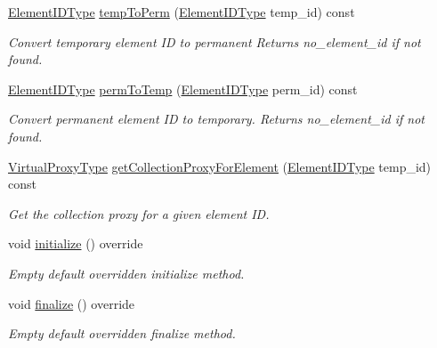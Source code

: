 \begin{DoxyCompactItemize}
\hyperlink{namespacevt_1_1vrt_1_1collection_1_1balance_a14c8d2c972f2913aa3f1636e5be0a120}{Element\+I\+D\+Type} \hyperlink{structvt_1_1vrt_1_1collection_1_1balance_1_1_node_stats_a259d49b9aa4759b9d94be3e093fa2e6b}{temp\+To\+Perm} (\hyperlink{namespacevt_1_1vrt_1_1collection_1_1balance_a14c8d2c972f2913aa3f1636e5be0a120}{Element\+I\+D\+Type} temp\+\_\+id) const
\begin{DoxyCompactList}\small\item\em Convert temporary element ID to permanent Returns {\ttfamily no\+\_\+element\+\_\+id} if not found. \end{DoxyCompactList}\item 
\hyperlink{namespacevt_1_1vrt_1_1collection_1_1balance_a14c8d2c972f2913aa3f1636e5be0a120}{Element\+I\+D\+Type} \hyperlink{structvt_1_1vrt_1_1collection_1_1balance_1_1_node_stats_a6e13d373b5365771b1f08fc0bd5c0bda}{perm\+To\+Temp} (\hyperlink{namespacevt_1_1vrt_1_1collection_1_1balance_a14c8d2c972f2913aa3f1636e5be0a120}{Element\+I\+D\+Type} perm\+\_\+id) const
\begin{DoxyCompactList}\small\item\em Convert permanent element ID to temporary. Returns {\ttfamily no\+\_\+element\+\_\+id} if not found. \end{DoxyCompactList}\item 
\hyperlink{namespacevt_a1b417dd5d684f045bb58a0ede70045ac}{Virtual\+Proxy\+Type} \hyperlink{structvt_1_1vrt_1_1collection_1_1balance_1_1_node_stats_aee43291b1cc63a189b3851f92e83040b}{get\+Collection\+Proxy\+For\+Element} (\hyperlink{namespacevt_1_1vrt_1_1collection_1_1balance_a14c8d2c972f2913aa3f1636e5be0a120}{Element\+I\+D\+Type} temp\+\_\+id) const
\begin{DoxyCompactList}\small\item\em Get the collection proxy for a given element ID. \end{DoxyCompactList}\item 
void \hyperlink{structvt_1_1vrt_1_1collection_1_1balance_1_1_node_stats_a0c60d1566daa6465f56b09e27058d6a1}{initialize} () override
\begin{DoxyCompactList}\small\item\em Empty default overridden initialize method. \end{DoxyCompactList}\item 
void \hyperlink{structvt_1_1vrt_1_1collection_1_1balance_1_1_node_stats_a267ac0f73734b89797be774b0bd6e7d1}{finalize} () override
\begin{DoxyCompactList}\small\item\em Empty default overridden finalize method. \end{DoxyCompactList}\end{DoxyCompactItemize}
